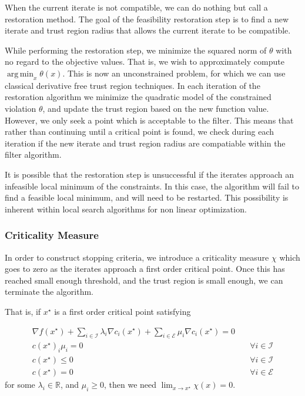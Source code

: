 \documentclass{article}
\DeclareMathOperator*{\argmin}{arg\,min}
\begin{document}
When the current iterate is not compatible, we can do nothing but call a restoration method.
The goal of the feasibility restoration step is to find a new iterate and trust region radius that allows the current iterate to be compatible.

While performing the restoration step, we 
minimize the squared norm of $\theta$ with no regard to the objective values.
That is, we wish to approximately compute $\argmin_x \theta(x)$.
This is now an unconstrained problem, for which we can use classical derivative free trust region techniques.
In each iteration of the restoration algorithm we minimize the quadratic model of the constrained violation $\theta$, 
and update the trust region based on the new function value.
However, we only seek a point which is acceptable to the filter.
This means that rather than continuing until a critical point is found, 
we check during each iteration if the new iterate and trust region radius are compatiable within the filter algorithm.

It is possible that the restoration step is unsuccessful if the iterates approach an infeasible local minimum of the constraints.
In this case, the algorithm will fail to find a feasible local minimum, and will need to be restarted.
This possibility is inherent within local search algorithms for non linear optimization.

\subsubsection{Criticality Measure}

In order to construct stopping criteria, we introduce a criticality measure $\chi$ which goes to zero as the iterates approach a first order critical point.
Once this has reached small enough threshold, and the trust region is small enough, we can terminate the algorithm.

That is, if $x^{\star}$ is a first order critical point satisfying

\begin{align*}
\nabla f(x^{\star}) + \sum_{i\in\mathcal I} \lambda_i \nabla c_i(x^{\star}) + \sum_{i\in \mathcal E} \mu_i \nabla c_i(x^{\star})  = 0 \\
c(x^{\star})_i \mu_i = 0 & \quad \forall i\in\mathcal I \\
c(x^{\star}) \le 0 & \quad \forall i\in\mathcal I\\
c(x^{\star}) = 0 & \quad \forall i\in\mathcal E
\end{align*}
for some $\lambda_i \in \mathbb R$, and $\mu_i \ge 0$, then we need $\lim_{x\to x^{\star}} \chi(x) = 0$.
\end{document}
